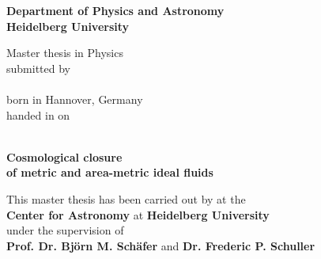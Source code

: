 \begin{titlepage}
\begin{center}
\makeatletter

\Large\textbf{Department of Physics and Astronomy\\
Heidelberg University}

\vfill

\normalsize
Master thesis in Physics\\
\normalsize
submitted by\\[0.5cm]
\Large
\textbf{\@author}\\
\normalsize
born in Hannover, Germany\\[0.5cm]
\normalsize
handed in on\\
\Large
\textbf{\@date}\\[0.5cm]
\normalsize


\cleardoublepage
\thispagestyle{empty}


\LARGE\textbf{Cosmological closure \\ of metric and area-metric ideal fluids}

\vfill

\normalsize
This master thesis has been carried out by \@author{} at the\\
\textbf{Center for Astronomy} at \textbf{Heidelberg University}\\
under the supervision of\\
\textbf{Prof. Dr. Björn M. Schäfer} and \textbf{Dr. Frederic P. Schuller}

\makeatother
\end{center}
\end{titlepage}

